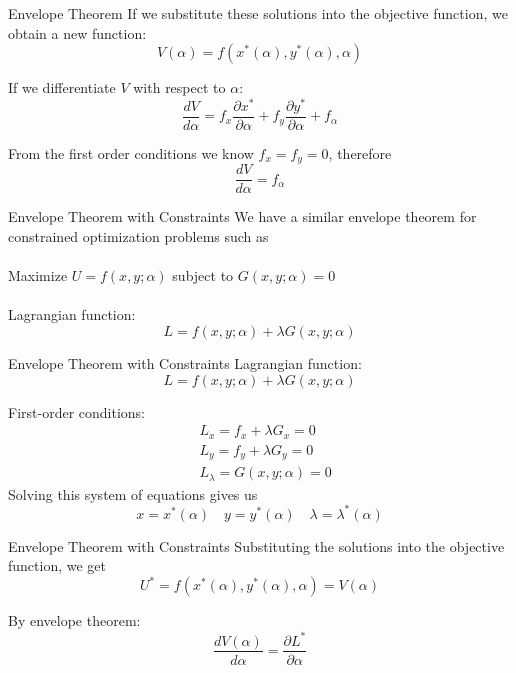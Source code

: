 \documentclass{./../../Latex/teaching_slides}
\begin{document}
\begin{frame}{Envelope Theorem}
If we substitute these solutions into the objective function, we obtain a new function:
$$
V(\alpha)=f\left(x^{*}(\alpha), y^{*}(\alpha), \alpha\right)
$$

\vspace{0.5em}
If we differentiate $V$ with respect to $\alpha$:
$$
\frac{d V}{d \alpha}=f_{x} \frac{\partial x^{*}}{\partial \alpha}+f_{y} \frac{\partial y^{*}}{\partial \alpha}+f_{\alpha}
$$

\vspace{0.5em}
From the first order conditions we know $f_{x}=f_{y}=0$, therefore
$$
\frac{d V}{d \alpha}=f_{\alpha}
$$
\end{frame}

\begin{frame}{Envelope Theorem with Constraints}
We have a similar envelope theorem for constrained optimization problems such as  \\~\\
\hspace{1em} Maximize $U=f(x, y ; \alpha)$ subject to $G(x, y ; \alpha)=0$ \\~\\
Lagrangian function:
$$
L=f(x, y ; \alpha)+\lambda G(x, y ; \alpha)
$$
\end{frame}

\begin{frame}{Envelope Theorem with Constraints}
Lagrangian function:
$$
L=f(x, y ; \alpha)+\lambda G(x, y ; \alpha)
$$

First-order conditions:
$$
\begin{aligned}
&L_{x}=f_{x}+\lambda G_{x}=0 \\
&L_{y}=f_{y}+\lambda G_{y}=0 \\
&L_{\lambda}=G(x, y ; \alpha)=0
\end{aligned}
$$
Solving this system of equations gives us
$$
x=x^{*}(\alpha) \quad y=y^{*}(\alpha) \quad \lambda=\lambda^{*}(\alpha)
$$

\end{frame}


\begin{frame}{Envelope Theorem with Constraints}
Substituting the solutions into the objective function, we get
$$
U^{*}=f\left(x^{*}(\alpha), y^{*}(\alpha), \alpha\right)=V(\alpha)
$$

\vspace{0.5em}
By envelope theorem:
$$
\frac{d V(\alpha)}{d \alpha}=\frac{\partial L^{*}}{\partial \alpha}
$$
\end{frame}
\end{document}
